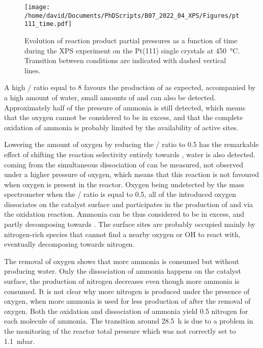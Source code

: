 \begin{figure}[!htb]
    \centering
    \texttt{[image: /home/david/Documents/PhDScripts/B07\_2022\_04\_XPS/Figures/pt111\_time.pdf]}
    \caption{
        Evolution of reaction product partial pressures as a function of time during the XPS experiment on the Pt(111) single crystals at \qty{450}{\degreeCelsius}.
        Transition between conditions are indicated with dashed vertical lines.
    }
    \label{fig:XPS111RGA}
\end{figure}

A high / ratio equal to \num{8} favours the production of  as expected, accompanied by a high amount of water, small amounts of  and  can also be detected.
Approximately half of the pressure of ammonia is still detected, which means that the oxygen cannot be considered to be in excess, and that the complete oxidation of ammonia is probably limited by the availability of active sites.

Lowering the amount of oxygen by reducing the / ratio to \num{0.5} has the remarkable effect of shifting the reaction selectivity entirely towards , water is also detected.
 coming from the simultaneous dissociation of  can be measured, not observed under a higher pressure of oxygen, which means that this reaction is not favoured when oxygen is present in the reactor.
Oxygen being undetected by the mass spectrometer when the / ratio is equal to \num{0.5}, all of the introduced oxygen dissociates on the catalyst surface and participates in the production of  and  via the oxidation reaction.
Ammonia can be thus considered to be in excess, and partly decomposing towards .
The surface sites are probably occupied mainly by nitrogen-rich species that cannot find a nearby oxygen or OH to react with, eventually decomposing towards nitrogen.

The removal of oxygen shows that more ammonia is consumed but without producing water.
Only the dissociation of ammonia happens on the catalyst surface, the production of nitrogen decreases even though more ammonia is consumed.
It is not clear why more nitrogen is produced under the presence of oxygen, when more ammonia is used for less production of  after the removal of oxygen.
Both the oxidation and dissociation of ammonia yield 0.5 nitrogen for each molecule of ammonia.
The transition around \qty{28.5}{\hour} is due to a problem in the monitoring of the reactor total pressure which was not correctly set to \qty{1.1}{\milli\bar}.

